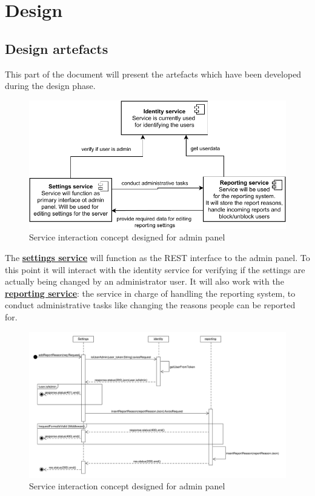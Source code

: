 

\chapter{Design}\label{ch:design}


\section{Design artefacts}\label{sec:design-artefacts}

This part of the document will present the artefacts which have been developed during the design phase.

\begin{figure}[h]
    \centering
    \includegraphics[width=1.0\textwidth]{./graphics/component_interaction}
    \caption{Service interaction concept designed for admin panel}
    \label{fig:componentInteraction}
\end{figure}

The \hyperref[subsubsec:settingsSer]{\textbf{settings service}} will function as the REST interface to the admin panel.
To this point it will interact with the identity service for verifying if the settings are actually being changed by an
administrator user.
It will also work with the \hyperref[subsubsec:reportingSer]{\textbf{reporting service}}: the service in charge of
handling the reporting system, to conduct administrative tasks like changing the reasons people can be reported for.

\begin{figure}[H]
    \centering
    \includegraphics[width=1.0\textwidth]{./graphics/SequenceDiagram_AddReportReason}
    \caption{Service interaction concept designed for admin panel}
    \label{fig:sequenceDiagramAddReportReason}
\end{figure}

